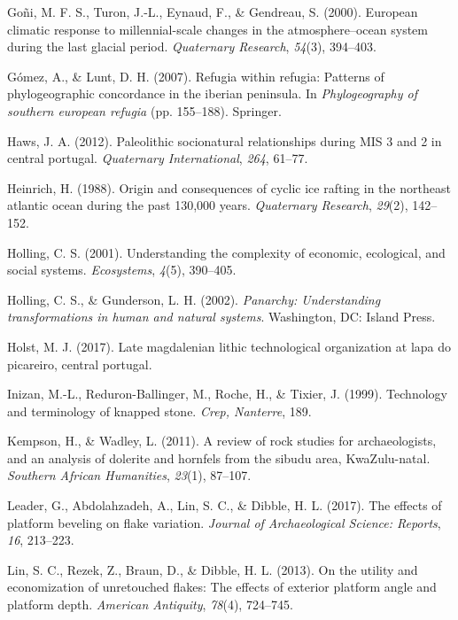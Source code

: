 \documentclass[12pt,twoside]{reedthesis}
\begin{document}
\leavevmode\hypertarget{ref-goni2000}{}%
Goñi, M. F. S., Turon, J.-L., Eynaud, F., \& Gendreau, S. (2000). European climatic response to millennial-scale changes in the atmosphere--ocean system during the last glacial period. \emph{Quaternary Research}, \emph{54}(3), 394--403.

\leavevmode\hypertarget{ref-gomez2007}{}%
Gómez, A., \& Lunt, D. H. (2007). Refugia within refugia: Patterns of phylogeographic concordance in the iberian peninsula. In \emph{Phylogeography of southern european refugia} (pp. 155--188). Springer.

\leavevmode\hypertarget{ref-haws2012}{}%
Haws, J. A. (2012). Paleolithic socionatural relationships during MIS 3 and 2 in central portugal. \emph{Quaternary International}, \emph{264}, 61--77.

\leavevmode\hypertarget{ref-heinrich1988}{}%
Heinrich, H. (1988). Origin and consequences of cyclic ice rafting in the northeast atlantic ocean during the past 130,000 years. \emph{Quaternary Research}, \emph{29}(2), 142--152.

\leavevmode\hypertarget{ref-holling2001}{}%
Holling, C. S. (2001). Understanding the complexity of economic, ecological, and social systems. \emph{Ecosystems}, \emph{4}(5), 390--405.

\leavevmode\hypertarget{ref-holling2002}{}%
Holling, C. S., \& Gunderson, L. H. (2002). \emph{Panarchy: Understanding transformations in human and natural systems}. Washington, DC: Island Press.

\leavevmode\hypertarget{ref-holst2017}{}%
Holst, M. J. (2017). Late magdalenian lithic technological organization at lapa do picareiro, central portugal.

\leavevmode\hypertarget{ref-inizan1999}{}%
Inizan, M.-L., Reduron-Ballinger, M., Roche, H., \& Tixier, J. (1999). Technology and terminology of knapped stone. \emph{Crep, Nanterre}, 189.

\leavevmode\hypertarget{ref-kempson2011}{}%
Kempson, H., \& Wadley, L. (2011). A review of rock studies for archaeologists, and an analysis of dolerite and hornfels from the sibudu area, KwaZulu-natal. \emph{Southern African Humanities}, \emph{23}(1), 87--107.

\leavevmode\hypertarget{ref-leader2017}{}%
Leader, G., Abdolahzadeh, A., Lin, S. C., \& Dibble, H. L. (2017). The effects of platform beveling on flake variation. \emph{Journal of Archaeological Science: Reports}, \emph{16}, 213--223.

\leavevmode\hypertarget{ref-linetal2013}{}%
Lin, S. C., Rezek, Z., Braun, D., \& Dibble, H. L. (2013). On the utility and economization of unretouched flakes: The effects of exterior platform angle and platform depth. \emph{American Antiquity}, \emph{78}(4), 724--745.
\end{document}
